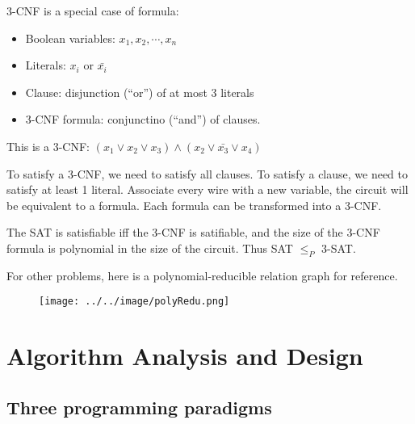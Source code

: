                 \begin{definition}[3-CNF]
                    3-CNF is a special case of formula:
                    \begin{itemize}
                        \item Boolean variables: $x_1, x_2, \cdots, x_n$
                        \item Literals: $x_i$ or $\bar{x_i}$
                        \item Clause: disjunction (``or'') of at most 3 literals
                        \item 3-CNF formula: conjunctino (``and'') of clauses.
                    \end{itemize}
                \end{definition}

                \begin{example}
                    This is a 3-CNF: $(x_1 \vee x_2 \vee x_3) \wedge (x_2 \vee \bar{x_3} \vee x_4)$
                \end{example}

                To satisfy a 3-CNF, we need to satisfy all clauses. To satisfy a clause, we need to satisfy at least 1 literal. Associate every wire with a new variable, the circuit will be equivalent to a formula. Each formula can be transformed into a 3-CNF. 

                The SAT is satisfiable iff the 3-CNF is satifiable, and the size of the 3-CNF formula is polynomial in the size of the circuit. Thus SAT $\le_P$ 3-SAT.

                For other problems, here is a polynomial-reducible relation graph for reference.

                \begin{figure}[H]
                    \centering
                    \texttt{[image: ../../image/polyRedu.png]}
                \end{figure}

    \section{Algorithm Analysis and Design}
        \subsection{Three programming paradigms}
